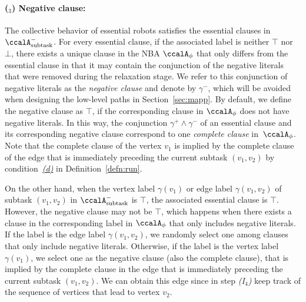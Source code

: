 \documentclass[Afour,sageh,times]{sagej}
\newcounter{mycounter}
\newcommand{\auto}[1]{\ccalA_{\textup{#1}}}
\newcommand{\autop}{\ccalA_{\phi}}
\begin{document}
{{   \paragraph{($_3$) Negative clause:} The collective behavior of essential robots satisfies the essential clauses in $\auto{subtask}^-$. For every essential clause, if the associated label is neither $\top$ nor $\bot$, there exists a unique clause in the NBA $\autop$ that only differs from the essential clause in that it may contain the conjunction of the negative literals that were removed during the relaxation stage. We refer to this conjunction of negative literals as the {\it negative clause} and denote by $\gamma^-$, which will be avoided when designing the low-level paths in Section~\ref{sec:mapp}. By default, we define the negative clause as $\top$, if the corresponding clause in $\autop$ does not have negative literals. In this way, the conjunction $\gamma^+ \wedge \gamma^-$ of an essential clause and its corresponding negative clause correspond to one {\it complete clause} in~$\autop$. Note that the complete clause of the vertex $v_1$ is implied by the complete clause of the edge that is immediately preceding the current subtask $(v_1, v_2)$ by condition~\hyperref[cond:d]{\it (d)} in Definition~\ref{defn:run}.

   On the other hand, when the vertex label $\gamma(v_1)$ or edge label $\gamma(v_1, v_2)$ of subtask $(v_1, v_2)$ in $\auto{subtask}^-$ is $\top$, the associated essential clause is $\top$. However, the negative clause may not be $\top$, which happens when there exists a  clause in the corresponding label in $\autop$ that only includes negative literals. If the label is the edge label $\gamma(v_1, v_2)$, we randomly select one among clauses that only include negative literals. Otherwise,  if the label is the vertex label $\gamma(v_1)$, we select one as the negative clause (also the complete clause), that is  implied by the complete clause in the edge that is immediately preceding the current subtask $(v_1, v_2)$. We can obtain this edge since in step {\it (I$_4$)} keep track of the sequence of vertices that lead to vertex $v_2$.}

}
\end{document}

